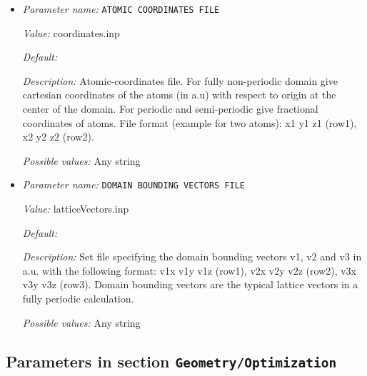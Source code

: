 \begin{itemize}
\item {\it Parameter name:} {\tt ATOMIC COORDINATES FILE}
\label{parameters:Geometry/ATOMIC COORDINATES FILE}
\label{parameters:Geometry/ATOMIC_20COORDINATES_20FILE}


{\it Value:} coordinates.inp


{\it Default:} 


{\it Description:} Atomic-coordinates file. For fully non-periodic domain give cartesian coordinates of the atoms (in a.u) with respect to origin at the center of the domain. For periodic and semi-periodic give fractional coordinates of atoms. File format (example for two atoms): x1 y1 z1 (row1), x2 y2 z2 (row2).


{\it Possible values:} Any string
\item {\it Parameter name:} {\tt DOMAIN BOUNDING VECTORS FILE}
\label{parameters:Geometry/DOMAIN BOUNDING VECTORS FILE}
\label{parameters:Geometry/DOMAIN_20BOUNDING_20VECTORS_20FILE}


{\it Value:} latticeVectors.inp


{\it Default:} 


{\it Description:} Set file specifying the domain bounding vectors v1, v2 and v3 in a.u. with the following format: v1x v1y v1z (row1), v2x v2y v2z (row2), v3x v3y v3z (row3). Domain bounding vectors are the typical lattice vectors in a fully periodic calculation.


{\it Possible values:} Any string
\end{itemize}



\subsection{Parameters in section \tt Geometry/Optimization}
\label{parameters:Geometry/Optimization}

